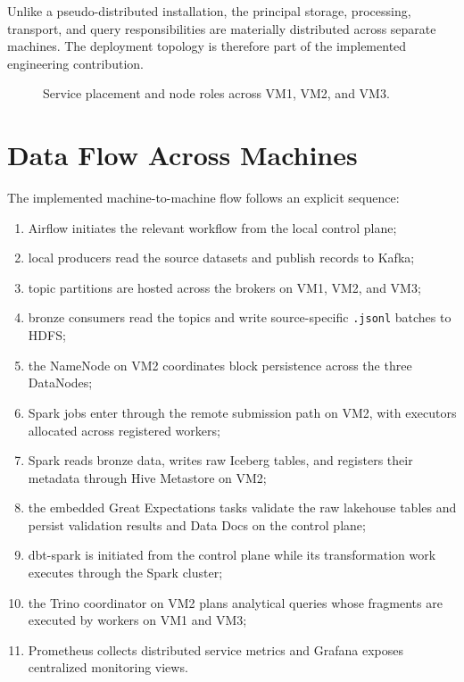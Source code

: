 Unlike a pseudo-distributed installation, the principal storage, processing, transport, and query responsibilities are materially distributed across separate machines. The deployment topology is therefore part of the implemented engineering contribution.

\begin{figure}[H]
    \centering
    
    \caption{Service placement and node roles across VM1, VM2, and VM3.}
    \label{fig:chapter6-vm-service-map}
\end{figure}
\FloatBarrier

\section{Data Flow Across Machines}
The implemented machine-to-machine flow follows an explicit sequence:
\begin{enumerate}[leftmargin=*,itemsep=2pt,topsep=4pt]
    \item Airflow initiates the relevant workflow from the local control plane;
    \item local producers read the source datasets and publish records to Kafka;
    \item topic partitions are hosted across the brokers on VM1, VM2, and VM3;
    \item bronze consumers read the topics and write source-specific \texttt{.jsonl} batches to HDFS;
    \item the NameNode on VM2 coordinates block persistence across the three DataNodes;
    \item Spark jobs enter through the remote submission path on VM2, with executors allocated across registered workers;
    \item Spark reads bronze data, writes raw Iceberg tables, and registers their metadata through Hive Metastore on VM2;
    \item the embedded Great Expectations tasks validate the raw lakehouse tables and persist validation results and Data Docs on the control plane;
    \item dbt-spark is initiated from the control plane while its transformation work executes through the Spark cluster;
    \item the Trino coordinator on VM2 plans analytical queries whose fragments are executed by workers on VM1 and VM3;
    \item Prometheus collects distributed service metrics and Grafana exposes centralized monitoring views.
\end{enumerate}

